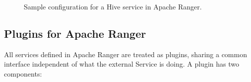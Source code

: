 \begin{figure}
    \centering
    \qquad
    \caption{Sample configuration for a Hive service in Apache Ranger.}
    \label{fig:ranger_hive_details}
\end{figure}

\subsection{Plugins for Apache Ranger}

All services defined in Apache Ranger are treated as plugins, sharing a common interface independent of what the external Service is doing. A plugin has two components:

